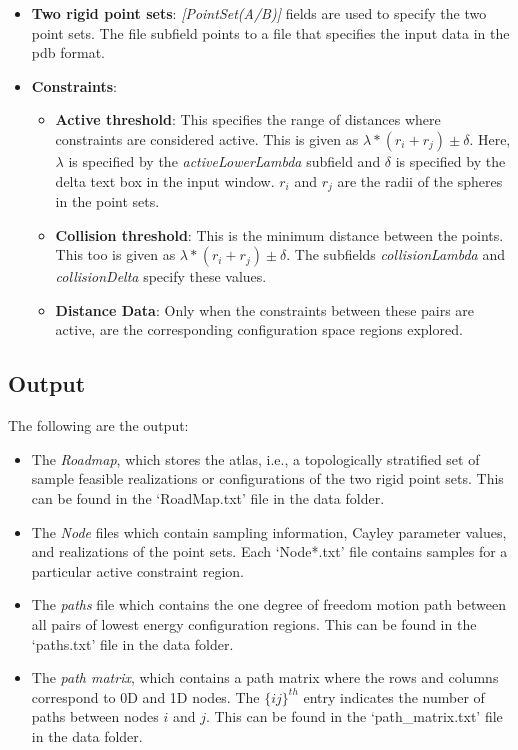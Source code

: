 \documentclass[10pt]{article}
\begin{document}
\begin{itemize}
\item \textbf{Two rigid point sets}: \emph{[PointSet(A/B)]} 
fields are used to specify the two point sets. The file subfield
points to a file that specifies the input data in the pdb format.
		

\item \textbf{Constraints}:
\begin{itemize}
\item \textbf{Active threshold}: This specifies the range of distances where
constraints are considered active.  This is given as $\lambda*(r_i+r_j) \pm
\delta$.  Here, $\lambda$ is specified by the \emph{activeLowerLambda} subfield
and $\delta$ is specified by the delta text box in the input window. $r_i$ and
$r_j$ are the radii of the spheres in the point sets. 

\item \textbf{Collision threshold}: This is the minimum distance between the
points. This too is given as $\lambda*(r_i+r_j) \pm \delta$.  The subfields
\emph{collisionLambda} and \emph{collisionDelta} specify these values.

\item \textbf{Distance Data}: Only when the constraints between these pairs are
active, are the corresponding configuration space regions explored.

\end{itemize}
\end{itemize}

\subsection{Output}

The following are the output:
\begin{itemize}
\item The \emph{Roadmap}, which stores the atlas, i.e., a topologically
stratified set of sample feasible realizations or configurations of the two
rigid point sets. This can be found in the `RoadMap.txt' file in the data
folder.

\item The \emph{Node} files which contain sampling information, Cayley
parameter values, and realizations of the point sets. Each `Node*.txt' file
contains samples for a particular active constraint region.

\item The \emph{paths} file which contains the one degree of freedom motion
path between all pairs of lowest energy configuration regions. This can be
found in the `paths.txt' file in the data folder.

\item The \emph{path matrix}, which contains a path matrix where the rows and
columns correspond to 0D and 1D nodes. The $\{ij\}^{th}$ entry indicates the
number of paths between nodes $i$ and $j$. This can be found in the
`path\_matrix.txt' file in the data folder.

\end{itemize}
\end{document}
